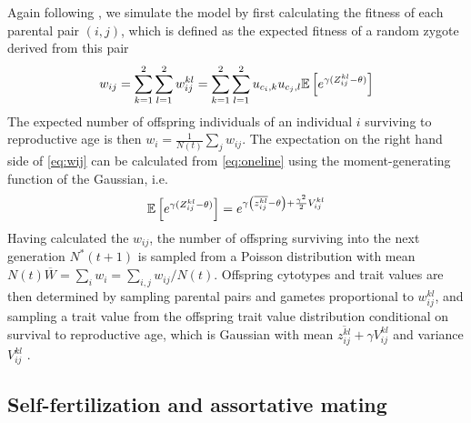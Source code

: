 \documentclass[12pt,a4paper]{article}
\begin{document}
    Again following \cite{barton2018}, we simulate the model by first calculating
    the fitness of each parental pair $(i,j)$, which is defined as the expected
    fitness of a random zygote derived from this pair
    \begin{equation}
      w_{ij}
        = \sum_{k=1}^2\sum_{l=1}^2 w_{ij}^{kl}
        = \sum_{k=1}^2\sum_{l=1}^2 u_{c_{i},k}u_{c_{j},l}
            \mathbb{E}\left[e^{\gamma(Z_{ij}^{kl} - \theta)}\right] \label{eq:wij}
    \end{equation}
    The expected number of offspring individuals of an individual $i$
    surviving to reproductive age is then $w_i = \frac{1}{N(t)}\sum_j w_{ij}$.
    The expectation on the right hand side of \cref{eq:wij} can be calculated
    from \cref{eq:oneline} using the moment-generating function of the
    Gaussian, i.e.
    \begin{equation}
        \mathbb{E}\left[e^{\gamma(Z_{ij}^{kl} - \theta)}\right] 
        = e^{\gamma \left(\overline{z_{ij}^{kl}} -\theta\right) +
        \frac{\gamma^2}{2}
        V_{ij}^{kl}} 
        \label{eq:Ew}
    \end{equation}
    Having calculated the $w_{ij}$, the number of offspring surviving into the next
    generation $N^\ast(t+1)$ is sampled from a Poisson distribution with mean
    $N(t)\overline{W} = \sum_i w_i = \sum_{i,j}w_{ij}/N(t)$.
    Offspring cytotypes and trait values are then determined by sampling
    parental pairs and gametes proportional to $w_{ij}^{kl}$, and sampling a
    trait value from the offspring trait value distribution conditional on
    survival to reproductive age, which is Gaussian with mean
    $\overline{z_{ij}^{kl}} + \gamma V_{ij}^{kl}$ and variance $V_{ij}^{kl}$ . 

    \subsection*{Self-fertilization and assortative mating}
\end{document}
